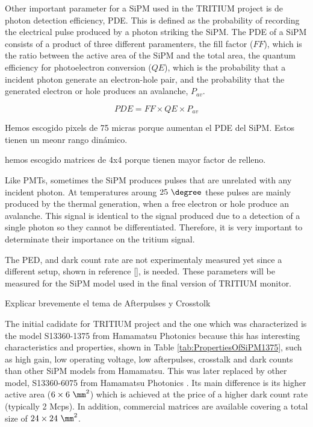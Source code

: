 Other important parameter for a SiPM used in the TRITIUM project is de photon detection efficiency, PDE. This is defined as the probability of recording the electrical pulse produced by a photon striking the SiPM. The PDE of a SiPM consists of a product of three different paramenters, the fill factor ($FF$), which is the ratio between the active area of the SiPM and the total area, the quantum efficiency for photoelectron conversion ($QE$), which is the probability that a incident photon generate an electron-hole pair, and the probability that the generated electron or hole produces an avalanche, $P_{av}$.

\begin{equation}
PDE=FF \times QE \times P_{av}
\label{PDE_SiPM}
\end{equation}

Hemos escogido pixels de 75 micras porque aumentan el PDE del SiPM. Estos tienen un meonr rango dinámico.

hemos escogido matrices de 4x4 porque tienen mayor factor de relleno.


Like PMTs, sometimes the SiPM produces pulses that are unrelated with any incident photon. At temperatures aroung $25~\degree$ these pulses are mainly produced by the thermal generation, when a free electron or hole produce an avalanche. This signal is identical to the signal produced due to a detection of a single photon so they cannot be differentiated. Therefore, it is very important to determinate their importance on the tritium signal.

The PED, and dark count rate are not experimentaly measured yet since a different setup, shown in reference \ref{}, is needed. These parameters will be measured for the SiPM model used in the final version of TRITIUM monitor.

Explicar brevemente el tema de Afterpulses y Crosstolk 

The initial cadidate for TRITIUM project and the one which was characterized is the model S13360-1375 from Hamamatsu Photonics \cite{DataSheetHammamatsu_1_SiPM_1375} because this has interesting characteristics and properties, shown in Table \ref{tab:PropertiesOfSiPM1375}, such as high gain, low operating voltage, low afterpulses, crosstalk and dark counts than other SiPM models from Hamamatsu. This was later replaced by other model, S13360-6075 from Hamamatsu Photonics \cite{DataSheetHammamatsu_1_SiPM_75}. Its main difference is its higher active area ($6\times6~\mm^2$) which is achieved at the price of a higher dark count rate (typically 2 Mcps). In addition, commercial matrices are available covering a total size of $24\times24~\mm^2$.

